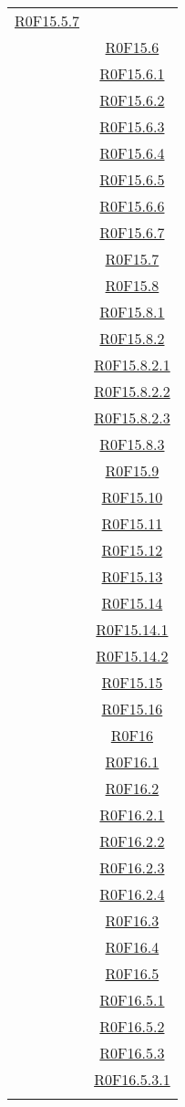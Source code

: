 \documentclass[../AnalisiDeiRequisiti.tex]{subfiles}
\begin{document}
\begin{longtable}{|c|c|}
\hyperlink{R0F15.5.7}{R0F15.5.7}\\& \hyperlink{R0F15.6}{R0F15.6}\\& \hyperlink{R0F15.6.1}{R0F15.6.1}\\& \hyperlink{R0F15.6.2}{R0F15.6.2}\\& \hyperlink{R0F15.6.3}{R0F15.6.3}\\& \hyperlink{R0F15.6.4}{R0F15.6.4}\\& \hyperlink{R0F15.6.5}{R0F15.6.5}\\& \hyperlink{R0F15.6.6}{R0F15.6.6}\\& \hyperlink{R0F15.6.7}{R0F15.6.7}\\& \hyperlink{R0F15.7}{R0F15.7}\\& \hyperlink{R0F15.8}{R0F15.8}\\& \hyperlink{R0F15.8.1}{R0F15.8.1}\\& \hyperlink{R0F15.8.2}{R0F15.8.2}\\& \hyperlink{R0F15.8.2.1}{R0F15.8.2.1}\\& \hyperlink{R0F15.8.2.2}{R0F15.8.2.2}\\& \hyperlink{R0F15.8.2.3}{R0F15.8.2.3}\\& \hyperlink{R0F15.8.3}{R0F15.8.3}\\& \hyperlink{R0F15.9}{R0F15.9}\\& \hyperlink{R0F15.10}{R0F15.10}\\& \hyperlink{R0F15.11}{R0F15.11}\\& \hyperlink{R0F15.12}{R0F15.12}\\& \hyperlink{R0F15.13}{R0F15.13}\\& \hyperlink{R0F15.14}{R0F15.14}\\& \hyperlink{R0F15.14.1}{R0F15.14.1}\\& \hyperlink{R0F15.14.2}{R0F15.14.2}\\& \hyperlink{R0F15.15}{R0F15.15}\\& \hyperlink{R0F15.16}{R0F15.16}\\& \hyperlink{R0F16}{R0F16}\\& \hyperlink{R0F16.1}{R0F16.1}\\& \hyperlink{R0F16.2}{R0F16.2}\\& \hyperlink{R0F16.2.1}{R0F16.2.1}\\& \hyperlink{R0F16.2.2}{R0F16.2.2}\\& \hyperlink{R0F16.2.3}{R0F16.2.3}\\& \hyperlink{R0F16.2.4}{R0F16.2.4}\\& \hyperlink{R0F16.3}{R0F16.3}\\& \hyperlink{R0F16.4}{R0F16.4}\\& \hyperlink{R0F16.5}{R0F16.5}\\& \hyperlink{R0F16.5.1}{R0F16.5.1}\\& \hyperlink{R0F16.5.2}{R0F16.5.2}\\& \hyperlink{R0F16.5.3}{R0F16.5.3}\\& \hyperlink{R0F16.5.3.1}{R0F16.5.3.1}\\& 
\end{longtable}
\end{document}

